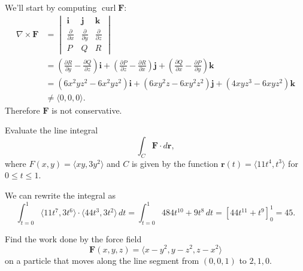 \documentclass{article}
\newenvironment{problem}[2][Problem]{\begin{trivlist}
\item[\hskip \labelsep {\bfseries #1}\hskip \labelsep {\bfseries #2.}]}{\end{trivlist}}
\newenvironment{solution}[1][Solution.]{\begin{trivlist}
\item[\hskip \labelsep {\bfseries #1}]}{\end{trivlist}}
\begin{document}
\begin{solution} $ $\\
  We'll start by computing $\operatorname{curl}\mathbf F$: \begin{align*}
    \nabla \times \mathbf F &= \begin{vmatrix}
      \mathbf i & \mathbf j & \mathbf k
      \\
      \displaystyle\frac{\partial}{\partial x}
      & \displaystyle\frac{\partial}{\partial y}
      & \displaystyle\frac{\partial}{\partial z}
      \\
      P & Q & R
    \end{vmatrix} \\
    &=
    \left(\frac{\partial R}{\partial y} - \frac{\partial Q}{\partial z}\right)\mathbf i +
    \left(\frac{\partial P}{\partial z} - \frac{\partial R}{\partial x}\right)\mathbf j +
    \left(\frac{\partial Q}{\partial x} - \frac{\partial P}{\partial y}\right)\mathbf k
    \\
    &=
    \left(6x^2yz^2 - 6x^2yz^2\right)\mathbf i +
    \left(6xy^2z - 6xy^2z^2\right)\mathbf j +
    \left(4xyz^3 - 6xyz^2\right)\mathbf k
    \\
    &\not= \langle 0, 0, 0 \rangle.
  \end{align*}
  Therefore $\mathbf F$ is not conservative.
\end{solution}
\pagebreak
\begin{problem}{13.2.19}
  Evaluate the line integral \[
    \int_C \mathbf F \cdot d\mathbf r,
  \] where $F(x,y) = \langle xy, 3y^2 \rangle$ and $C$ is given by the
  function $\mathbf r(t) = \langle 11t^4, t^3 \rangle$ for $0 \leq t \leq 1$.
\end{problem}

\begin{solution} $ $\\
  We can rewrite the integral as \[
    \int_{t=0}^{1} \langle 11t^7, 3t^6\rangle \cdot \langle 44t^3, 3t^2 \rangle\,dt
    = \int_{t=0}^{1} 484t^{10} + 9t^8\,dt
    = [44t^{11} + t^9]_0^1 = 45.
  \]
\end{solution}

\begin{problem}{13.2.39}
  Find the work done by the force field \[
    \mathbf F(x,y,z) = \langle x-y^2, y-z^2, z - x^2 \rangle
  \] on a particle that moves along the line segment from $(0, 0, 1)$ to
  $2, 1, 0$.
\end{problem}
\end{document}
